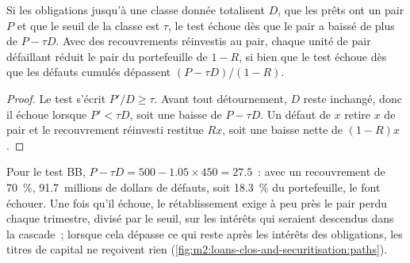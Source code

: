 \begin{proposition}\label{prop:m2:loans-clos-and-securitisation:cushion}
Si les obligations jusqu'à une classe donnée totalisent $D$, que les prêts ont un pair $P$ et que le
seuil de la classe est $\tau$, le test échoue dès que le pair a baissé de plus de $P - \tau D$. Avec
des recouvrements réinvestis au pair, chaque unité de pair défaillant réduit le pair du portefeuille de
$1 - R$, si bien que le test échoue dès que les défauts cumulés dépassent $(P - \tau D)/(1 - R)$.
\end{proposition}

\begin{proof}
Le test s'écrit $P'/D \geq \tau$. Avant tout détournement, $D$ reste inchangé, donc il échoue lorsque
$P' < \tau D$, soit une baisse de $P - \tau D$. Un défaut de $x$ retire $x$ de pair et le
recouvrement réinvesti restitue $Rx$, soit une baisse nette de $(1-R)x$.
\end{proof}

Pour le test BB, $P - \tau D = 500 - 1.05 \times 450 = 27.5$~: avec un recouvrement de 70~\%,
91.7~millions de dollars de défauts, soit 18.3~\% du portefeuille, le font échouer. Une fois qu'il échoue, le
rétablissement exige à peu près le pair perdu chaque trimestre, divisé par le seuil, sur les intérêts
qui seraient descendus dans la cascade~; lorsque cela dépasse ce qui reste après les
intérêts des obligations, les titres de capital ne reçoivent rien
(\cref{fig:m2:loans-clos-and-securitisation:paths}).

